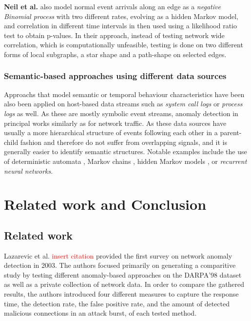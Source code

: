 \documentclass[a4paper,12pt,twoside]{report}
\begin{document}
\textbf{Neil et al.}  \cite{neil2013scan} also model normal event arrivals along an edge as a \textit{negative Binomial process} with two different rates, evolving as a hidden Markov model, and correlation in different time intervals in then used  using a likelihood ratio test to obtain p-values. In their approach, instead of testing network wide correlation, which is computationally unfeasible, testing is done on two different forms of local subgraphs, a star shape and a path-shape on selected edges. 


\subsection{Semantic-based approaches using different data sources}

Approachs that model semantic or temporal behaviour characteristics have been also been applied on host-based data streams such as \textit{system call logs} or \textit{process logs} as well. As these are mostly symbolic event streams, anomaly detection in principal works similarly as for network traffic. As these data sources have usually a more hierarchical structure of events following each other in a parent-child fashion and therefore do not suffer from overlapping signals, and it is generally easier to identify semantic structures. Notable examples include the use of deterministic automata \cite{warrender1999detecting}, Markov chains \cite{ye2000markov}, hidden Markov models \cite{yeung2003host,hu2009simple}, or \textit{recurrent neural networks}\cite{du2017deeplog}.


\chapter{Related work and Conclusion}

\section{Related work}

Lazarevic et al. \textcolor{red}{insert citation} provided the first survey on network anomaly detection in 2003. The authors focused primarily on generating a comparitive study by testing different anomaly-based approaches on the DARPA'98 dataset as well as a private collection of network data. In order to compare the gathered results, the authors introduced four different measures to capture the response time, the detection rate, the false positive rate, and the amount of detected malicious connections in an attack burst, of each tested method. 
\end{document}
